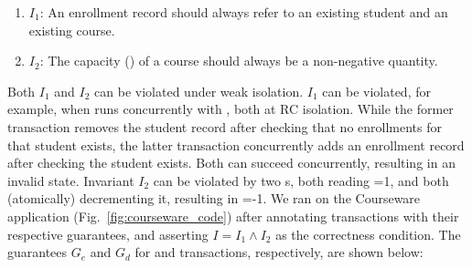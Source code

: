 \begin{enumerate}
\item  $I_1$: An enrollment record should always refer to an existing student and an existing course.
\item  $I_2$: The capacity () of a course should always be a
  non-negative quantity.
\end{enumerate}
\noindent Both $I_1$ and $I_2$ can be violated under weak isolation.
$I_1$ can be violated, for example, when  runs
concurrently with , both at RC isolation. While the former
transaction removes the student record after checking that no
enrollments for that student exists, the latter transaction
concurrently adds an enrollment record after checking the student
exists.  Both can succeed concurrently, resulting in an invalid state.
Invariant $I_2$ can be violated by two s, both reading
=1, and both (atomically) decrementing it, resulting in
=-1.  We ran \thetool on the Courseware application
(Fig.~\ref{fig:courseware_code}) after annotating transactions with
their respective guarantees, and asserting $I = I_1 \wedge I_2$ as the
correctness condition. The guarantees $G_e$ and $G_d$ for 
and  transactions, respectively, are shown below:
